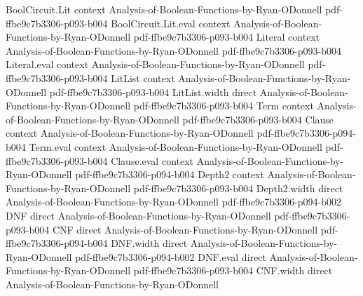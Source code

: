 \begin{lemma}
\leanok
{}
\proofstep
  {BoolCircuit.Lit}
  {context}
  {Analysis-of-Boolean-Functions-by-Ryan-ODonnell}
  {pdf-ffbe9c7b3306-p093-b004}
\proofstep
  {BoolCircuit.Lit.eval}
  {context}
  {Analysis-of-Boolean-Functions-by-Ryan-ODonnell}
  {pdf-ffbe9c7b3306-p093-b004}
\proofstep
  {Literal}
  {context}
  {Analysis-of-Boolean-Functions-by-Ryan-ODonnell}
  {pdf-ffbe9c7b3306-p093-b004}
\proofstep
  {Literal.eval}
  {context}
  {Analysis-of-Boolean-Functions-by-Ryan-ODonnell}
  {pdf-ffbe9c7b3306-p093-b004}
\proofstep
  {LitList}
  {context}
  {Analysis-of-Boolean-Functions-by-Ryan-ODonnell}
  {pdf-ffbe9c7b3306-p093-b004}
\proofstep
  {LitList.width}
  {direct}
  {Analysis-of-Boolean-Functions-by-Ryan-ODonnell}
  {pdf-ffbe9c7b3306-p093-b004}
\proofstep
  {Term}
  {context}
  {Analysis-of-Boolean-Functions-by-Ryan-ODonnell}
  {pdf-ffbe9c7b3306-p093-b004}
\proofstep
  {Clause}
  {context}
  {Analysis-of-Boolean-Functions-by-Ryan-ODonnell}
  {pdf-ffbe9c7b3306-p094-b004}
\proofstep
  {Term.eval}
  {context}
  {Analysis-of-Boolean-Functions-by-Ryan-ODonnell}
  {pdf-ffbe9c7b3306-p093-b004}
\proofstep
  {Clause.eval}
  {context}
  {Analysis-of-Boolean-Functions-by-Ryan-ODonnell}
  {pdf-ffbe9c7b3306-p094-b004}
\proofstep
  {Depth2}
  {context}
  {Analysis-of-Boolean-Functions-by-Ryan-ODonnell}
  {pdf-ffbe9c7b3306-p093-b004}
\proofstep
  {Depth2.width}
  {direct}
  {Analysis-of-Boolean-Functions-by-Ryan-ODonnell}
  {pdf-ffbe9c7b3306-p094-b002}
\proofstep
  {DNF}
  {direct}
  {Analysis-of-Boolean-Functions-by-Ryan-ODonnell}
  {pdf-ffbe9c7b3306-p093-b004}
\proofstep
  {CNF}
  {direct}
  {Analysis-of-Boolean-Functions-by-Ryan-ODonnell}
  {pdf-ffbe9c7b3306-p094-b004}
\proofstep
  {DNF.width}
  {direct}
  {Analysis-of-Boolean-Functions-by-Ryan-ODonnell}
  {pdf-ffbe9c7b3306-p094-b002}
\proofstep
  {DNF.eval}
  {direct}
  {Analysis-of-Boolean-Functions-by-Ryan-ODonnell}
  {pdf-ffbe9c7b3306-p093-b004}
\proofstep
  {CNF.width}
  {direct}
  {Analysis-of-Boolean-Functions-by-Ryan-ODonnell}

\end{lemma}
